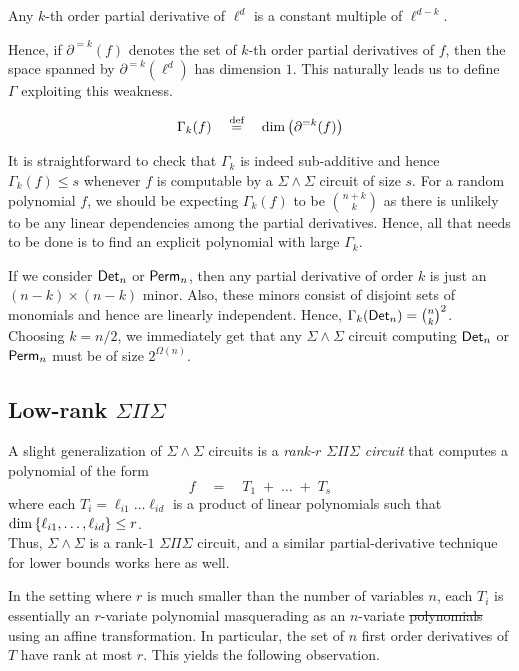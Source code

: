 \documentclass{birkjour}
\newcommand{\spaced}[1]{\quad#1\quad}
\providecommand{\DIFaddtex}[1]{{\protect\color{blue}\uwave{#1}}} %
\providecommand{\DIFdeltex}[1]{{\protect\color{red}\sout{#1}}}                      %
\providecommand{\DIFaddbegin}{} %
\providecommand{\DIFaddend}{} %
\providecommand{\DIFdelbegin}{} %
\providecommand{\DIFdelend}{} %
\providecommand{\DIFadd}[1]{\texorpdfstring{\DIFaddtex{#1}}{#1}} %
\providecommand{\DIFdel}[1]{\texorpdfstring{\DIFdeltex{#1}}{}} %
\begin{document}
\begin{observation}
Any $k$-th order partial derivative of $\ell^d$ is a constant multiple of $\ell^{d-k}$. 
\end{observation}

Hence, if $\partial^{=k}(f)$ denotes the set of $k$-th order partial derivatives of $f$, then the space spanned by $\partial^{=k}(\ell^d)$ has dimension $1$. This naturally leads us to define $\Gamma$ exploiting this weakness. 

$$
\Gamma_k(f)\quad \stackrel{\text{def}}{=} \quad \dim \left(\partial^{=k}(f)\right)
$$

It is straightforward to check that $\Gamma_k$ is indeed sub-additive and hence $\Gamma_k(f) \leq s$ whenever $f$ is computable by a $\Sigma\!\wedge\!\Sigma$ circuit of size $s$. For a random polynomial $f$, we should be expecting $\Gamma_k(f)$ to be $\binom{n+k}{k}$ as there is unlikely to be any linear dependencies among the partial derivatives. Hence, all that needs to be done is to find an explicit polynomial with large $\Gamma_k$. 


If we consider $\mathsf{Det}_n$ or $\mathsf{Perm}_n$, then any partial derivative of order $k$ is just an $(n-k)\times(n-k)$ minor. Also, these minors consist of disjoint sets of monomials and hence are linearly independent. Hence, $\Gamma_k(\mathsf{Det}_n) = \binom{n}{k}^2$. Choosing $k = n/2$, we immediately get that any $\Sigma\!\wedge\!\Sigma$ circuit computing $\mathsf{Det}_n$ or $\mathsf{Perm}_n$ must be of size $2^{\Omega(n)}$. \\

\subsection{Low-rank $\Sigma\Pi\Sigma$}\label{sec:low-rank-sps}

A slight generalization of $\Sigma\!\wedge\!\Sigma$ circuits is a \emph{rank-$r$ $\Sigma\Pi\Sigma$ circuit} that computes a polynomial of the form 
$$
f \spaced{=}  T_1 \;+\; \dots \;+\; T_s
$$
where each $T_i = \ell_{i1}\dots \ell_{id}$ is a product of linear polynomials such that $\dim\left\{\ell_{i1},\dots, \ell_{id}\right\}\leq r$. \\

Thus, $\Sigma\!\wedge\!\Sigma$  is a rank-$1$ $\Sigma\Pi\Sigma$ circuit, and a similar partial-derivative technique for lower bounds works here as well. 

In the setting where $r$ is much smaller than the number of variables $n$, each $T_i$ is essentially an $r$-variate polynomial masquerading as an $n$-variate \DIFdelbegin \DIFdel{polynomials }\DIFdelend \DIFaddbegin \DIFadd{polynomial }\DIFaddend using an affine transformation. In particular, the set of $n$ first order derivatives of $T$ have rank at most $r$. This yields the following observation.
\end{document}
